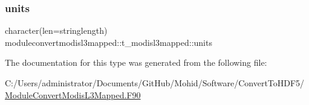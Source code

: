 \subsubsection{\texorpdfstring{units}{units}}
{\footnotesize\ttfamily character(len=stringlength) moduleconvertmodisl3mapped\+::t\+\_\+modisl3mapped\+::units\hspace{0.3cm}{\ttfamily [private]}}



The documentation for this type was generated from the following file\+:\begin{DoxyCompactItemize}
\item 
C\+:/\+Users/administrator/\+Documents/\+Git\+Hub/\+Mohid/\+Software/\+Convert\+To\+H\+D\+F5/\mbox{\hyperlink{_module_convert_modis_l3_mapped_8_f90}{Module\+Convert\+Modis\+L3\+Mapped.\+F90}}\end{DoxyCompactItemize}
